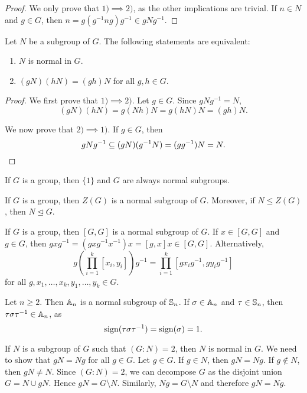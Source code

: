 \begin{proof}
We only prove that $1)\implies 2)$, as the other implications are trivial. If $n\in N$ and $g\in G$, then 
$n=g(g^{-1}ng)g^{-1}\in gNg^{-1}$.
\end{proof}

\begin{proposition}
    Let $N$ be a subgroup of $G$. The following statements
    are equivalent: 
    \begin{enumerate}
        \item $N$ is normal in $G$.
        \item $(gN)(hN)=(gh)N$ for all $g,h\in G$.
    \end{enumerate}
\end{proposition}

\begin{proof}
   We first prove that $1)\implies 2)$. Let $g\in G$. Since
   $gNg^{-1}=N$, 
   \[
   (gN)(hN)=g(Nh)N=g(hN)N=(gh)N.
   \]
   
   We now prove that $2)\implies1)$. If $g\in G$, then
    \[
    gNg^{-1}\subseteq (gN)(g^{-1}N)=(gg^{-1})N=N.\qedhere
    \]
\end{proof}

If $G$ is a group, then 
$\{1\}$ and $G$ are always normal subgroups. 

\begin{example}
If $G$ is a group, then $Z(G)$ is a normal subgroup of $G$. Moreover, 
if $N\leq Z(G)$, then $N\unlhd
G$.
\end{example}

\begin{example}
If $G$ is a group, then  $[G,G]$ is a normal subgroup of $G$. If 
$x\in [G,G]$ and $g\in G$, then
$gxg^{-1}=(gxg^{-1}x^{-1})x=[g,x]x\in [G,G]$. Alternatively,
\[
g\left(\prod_{i=1}^k[x_i,y_i]\right)g^{-1}=\prod_{i=1}^k [gx_ig^{-1},gy_ig^{-1}]
\]
for all $g,x_1,\dots,x_k,y_1,\dots,y_k\in G$.
\end{example}

\begin{example}
Let $n\geq2$. Then 
$\mathbb{A}_n$ is a normal subgroup of $\mathbb{S}_n$.
If $\sigma\in\mathbb{A}_n$ and $\tau\in\mathbb{S}_n$, then $\tau\sigma\tau^{-1}\in\mathbb{A}_n$, as 
\[
\operatorname{sign}(\tau\sigma\tau^{-1})=\operatorname{sign}(\sigma)=1.
\]
\end{example}

\begin{example}
If $N$ is a subgroup of $G$ such that $(G:N)=2$, then $N$ is normal in $G$. We need to show that $gN=Ng$ for all $g\in G$. Let $g\in G$. 
If $g\in N$, then $gN=Ng$. If $g\not\in N$, then
$gN\ne N$. Since $(G:N)=2$, we can decompose $G$ as 
the disjoint union $G=N\cup gN$. Hence 
$gN=G\setminus N$. Similarly, 
$Ng=G\setminus N$ and therefore $gN=Ng$.
\end{example}


